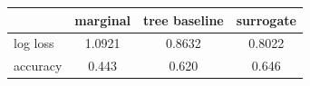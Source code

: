 \begin{tabular}{lccc}
\toprule
 & marginal & tree baseline & surrogate \\
\midrule
log loss & 1.0921 & 0.8632 & 0.8022 \\
accuracy & 0.443 & 0.620 & 0.646 \\
\bottomrule
\end{tabular}
